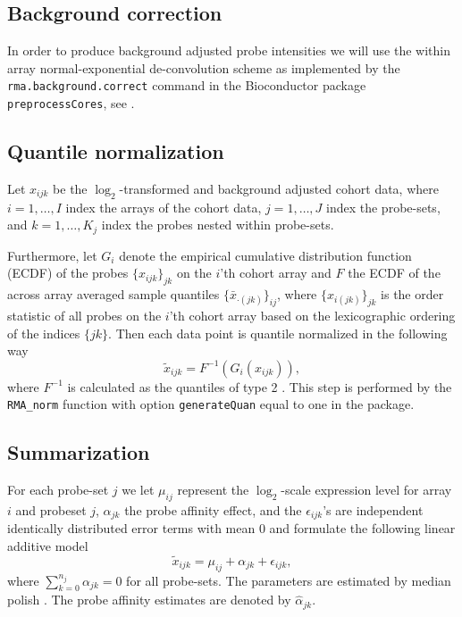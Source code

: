 \documentclass{article}
\begin{document}
\subsection*{Background correction}
In order to produce background adjusted probe intensities we will use the within array normal-exponential de-convolution scheme as implemented by the \texttt{rma.background.correct} command in the Bioconductor package \texttt{preprocessCores}, see
\citep{Irizarry2003b,Bolstad2004}.


\subsection*{Quantile normalization}
Let $x_{ijk}$ be the $\log_2$-transformed and background adjusted cohort data, where $i = 1,\dots,I$ index the arrays of the cohort data, $j=1,\dots,J$  index the probe-sets, and $k=1,\dots,K_j$ index the probes nested within probe-sets.

Furthermore, let $G_i$ denote the empirical cumulative distribution function (ECDF) of the probes $\{x_{ijk}\}_{jk}$ on the $i$'th cohort array and $F$ the ECDF of the across array averaged sample quantiles $\{\bar{x}_{\cdot (jk)}\}_{ij}$, where $\{x_{i(jk)}\}_{jk}$ is the order statistic of all probes on the $i$'th cohort array based on the lexicographic ordering of the indices $\{jk\}$. Then each data point is quantile normalized in the following way
\begin{equation*}
     \tilde{x}_{ijk} = F^{-1}(G_i(x_{ijk})),
\end{equation*}
where $F^{-1}$ is calculated as the quantiles of type 2 \citep{Hyndman1996}.
This step is performed by the \texttt{RMA\_norm} function with option \texttt{generateQuan} equal to one in the  package.

\subsection*{Summarization}

For each probe-set $j$ we let $\mu_{ij}$ represent the $\log_2$-scale expression level for array $i$ and probeset $j$, $\alpha_{jk}$ the probe affinity effect, and the $\epsilon_{ijk}$'s are independent identically distributed  error terms with mean 0 and formulate the following linear additive model
\begin{equation*}
   \tilde{x}_{ijk} = \mu_{ij} + \alpha_{jk}+ \epsilon_{ijk},
\end{equation*}
where $\sum_{k=0}^{n_j} \alpha_{jk} = 0$ for all probe-sets. The parameters are estimated by median polish \citep{Holder2001}. The probe affinity estimates are denoted by $\hat{\alpha}_{jk}$.
\end{document}
